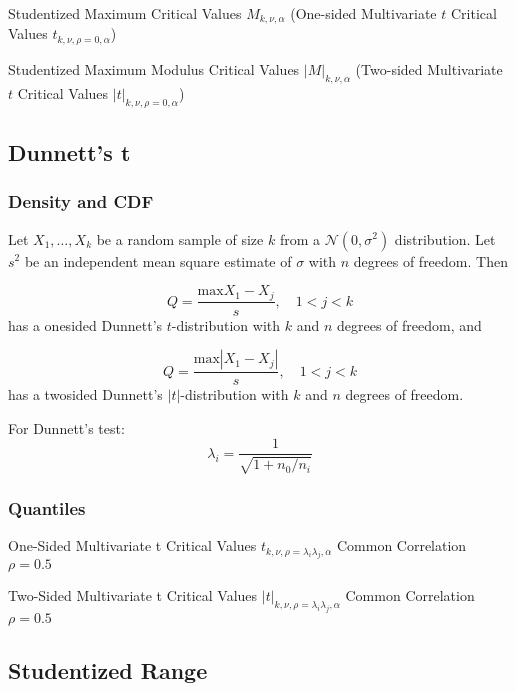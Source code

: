 Studentized  Maximum  Critical  Values  $M_{k, \nu, \alpha}$   (One-sided  Multivariate  $t$  Critical  Values  $t_{k, \nu, \rho=0 , \alpha}$) 

Studentized Maximum Modulus Critical Values $|M|_{k, \nu, \alpha}$   (Two-sided 
Multivariate  $t$  Critical  Values  $|t|_{k, \nu, \rho=0 , \alpha}$) 







\subsection{Dunnett's t}

\subsubsection{Density and CDF}
Let $X_1,\ldots,X_k$ be a random sample of size $k$ from a $\mathcal{N}(0,\sigma^2)$ distribution. Let $s^2$ be an independent mean square estimate of $\sigma$ with $n$ degrees of freedom. Then 

\begin{equation}
	Q=\frac{\text{max}X_1 - X_j}{s}, \quad 1<j<k
\end{equation}
has a onesided Dunnett's $t$-distribution with $k$ and $n$ degrees of freedom, and

\begin{equation}
	Q=\frac{\text{max}|X_1 - X_j|}{s}, \quad 1<j<k
\end{equation}
has a twosided Dunnett's $|t|$-distribution with $k$ and $n$ degrees of freedom.


For Dunnett's test:
\begin{equation}
	\lambda_i=\frac{1}{\sqrt{1+n_0/n_i}}
\end{equation}


\subsubsection{Quantiles}

One-Sided  Multivariate  t  Critical Values $t_{k, \nu, \rho=\lambda_i \lambda_j , \alpha}$   Common  Correlation  $\rho=0.5$ 


Two-Sided  Multivariate  t  Critical Values $|t|_{k, \nu, \rho=\lambda_i \lambda_j  , \alpha}$   Common  Correlation  $\rho=0.5$ 



\subsection{Studentized Range}

